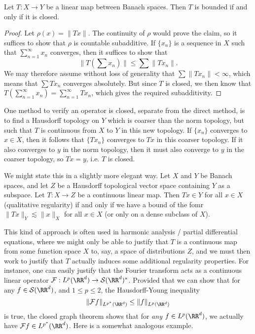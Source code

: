\begin{theorem}
    Let $T: X \to Y$ be a linear map between Banach spaces. Then $T$ is bounded if and only if it is closed.
\end{theorem}
\begin{proof}
    Let $\rho(x) = \| Tx \|$. The continuity of $\rho$ would prove the claim, so it suffices to show that $\rho$ is countable subadditive. If $\{ x_n \}$ is a sequence in $X$ such that $\sum_{n = 1}^\infty x_n$ converges, then it suffices to show that
    \[ \| T(\sum x_n) \| \leq \sum \| Tx_n \|. \]
    We may therefore assume without loss of generality that $\sum \| Tx_n \| < \infty$, which means that $\sum Tx_n$ converges absolutely. But since $T$ is closed, we then know that $T(\sum_{n = 1}^\infty x_n) = \sum_{n = 1}^\infty Tx_n$, which gives the required subadditivity.
\end{proof}

One method to verify an operator is closed, separate from the direct method, is to find a Hausdorff topology on $Y$ which is coarser than the norm topology, but such that $T$ is continuous from $X$ to $Y$ in this new topology. If $\{ x_n \}$ converges to $x \in X$, then it follows that $\{ Tx_n \}$ converges to $Tx$ in this coarser topology. If it also converges to $y$ in the norm topology, then it must also converge to $y$ in the coarser topology, so $Tx = y$, i.e. $T$ is closed.

We might state this in a slightly more elegant way. Let $X$ and $Y$ be Banach spaces, and let $Z$ be a Hausdorff topological vector space containing $Y$ as a subspace. Let $T: X \to Z$ be a continuous linear map. Then $Tx \in Y$ for all $x \in X$ (qualitative regularity) if and only if we have a bound of the fomr $\| Tx \|_Y \lesssim \| x \|_X$ for all $x \in X$ (or only on a dense subclass of $X$).

This kind of approach is often used in harmonic analysis / partial differential equations, where we might only be able to justify that $T$ is a continuous map from some function space $X$ to, say, a space of distributions $Z$, and we must then work to justify that $T$ actually induces some additional regularity properties. For instance, one can easily justify that the Fourier transform acts as a continuous linear operator $\mathcal{F}: L^p(\RR^d) \to \mathcal{S}(\RR^d)^*$. Provided that we can show that for any $f \in \mathcal{S}(\RR^d)$, and $1 \leq p \leq 2$, the Hausdorff-Young inequality
%
\[ \| \mathcal{F} f \|_{L^{p^*}(\RR^d)} \leq \| f \|_{L^p(\RR^d)} \]
%
is true, the closed graph theorem shows that for \emph{any} $f \in L^p(\RR^d)$, we actually have $\mathcal{F} f \in L^{p^*}(\RR^d)$. Here is a somewhat analogous example.

